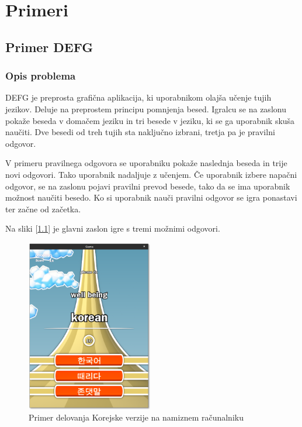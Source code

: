 \chapter{Primeri}

\section{Primer DEFG}

\subsection{Opis problema}

DEFG je preprosta grafična aplikacija, ki uporabnikom olajša učenje tujih jezikov. Deluje na preprostem principu pomnjenja besed. Igralcu se na zaslonu pokaže beseda v domačem jeziku in tri besede v jeziku, ki se ga uporabnik skuša naučiti. Dve besedi od treh tujih sta naključno izbrani, tretja pa je pravilni odgovor.

V primeru pravilnega odgovora se uporabniku pokaže naslednja beseda in trije novi odgovori. Tako uporabnik nadaljuje z učenjem. Če uporabnik izbere napačni odgovor, se na zaslonu pojavi pravilni prevod besede, tako da se ima uporabnik možnost naučiti besedo. Ko si uporabnik nauči pravilni odgovor se igra ponastavi ter začne od začetka.

Na sliki [\ref{korean}] je glavni zaslon igre s tremi možnimi odgovori.

\begin{figure}
\begin{center}
\includegraphics[width=5.5cm]{pic/defg-korean.png}
\end{center}
\caption{Primer delovanja Korejske verzije na namiznem računalniku}
\label{korean}
\end{figure} 


